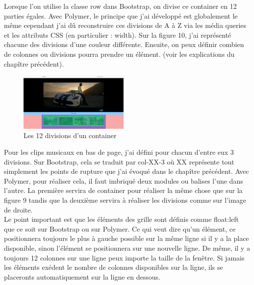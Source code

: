 \documentclass{article}
\begin{document}
Lorsque l'on utilise la classe \og row \fg{} dans Bootstrap, on divise ce container en 12 parties \'egales. Avec Polymer, le principe que j'ai d\'evelopp\'e est globalement le m\^eme cependant j'ai d\^u reconstruire ces divisions de A \`a Z via les m\'edia queries et les attributs CSS (en particulier : width). Sur la figure 10, j'ai repr\'esent\'e chacune des divisions d'une couleur diff\'erente. Ensuite, on peux d\'efinir combien de colonnes ou divisions pourra prendre un \'el\'ement. (voir les explications du chap\^itre pr\'ec\'edent).\\

\begin{figure}
  \vspace{-25pt}
  \begin{center}
    \includegraphics[width=0.48\textwidth]{p11}
  \end{center}
  \vspace{-20pt}
  \caption{Les 12 divisions d'un container}
  \vspace{-10pt}
\end{figure} 

Pour les clips musicaux en bas de page, j'ai d\'efini pour chacun d'entre eux 3 divisions. Sur Bootstrap, cela se traduit par \og col-XX-3 \fg{} o\`u XX repr\'esente tout simplement les points de rupture que j'ai \'evoqu\'e dans le chap\^itre pr\'ec\'edent. Avec Polymer, pour r\'ealiser cela, il faut imbriqu\'e deux modules ou balises l'une dans l'autre. La premi\`ere servira de container pour r\'ealiser la m\^eme chose que sur la figure 9 tandis que la deuxi\`eme servira \`a r\'ealiser les divisions comme sur l'image de droite.\\

Le point important est que les \'el\'ements des grille sont d\'efinis comme \og float:left \fg{} que ce soit sur Bootstrap ou sur Polymer. Ce qui veut dire qu'un \'el\'ement, ce positionnera toujours le plus \`a gauche possible sur la m\^eme ligne si il y a la place disponible, sinon l'\'el\'ement se positionnera sur une nouvelle ligne. De m\^eme, il y a toujours 12 colonnes sur une ligne peux importe la taille de la fen\^etre. Si jamais les \'el\'ements ex\'edent le nombre de colonnes disponibles sur la ligne, ils se placeronts automatiquement sur la ligne en dessous.\\
\end{document}
